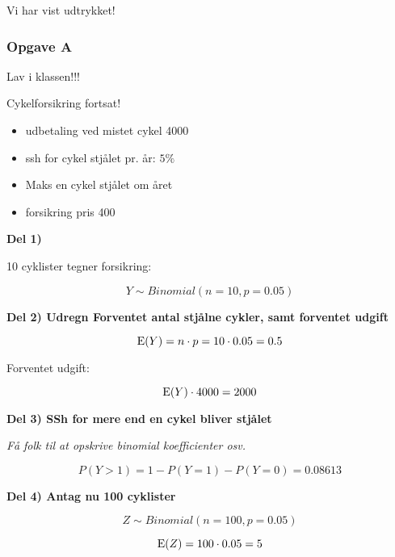 Vi har vist udtrykket!

\subsubsection{Opgave A}

Lav i klassen!!!

Cykelforsikring fortsat!

\begin{itemize}
    \item udbetaling ved mistet cykel 4000
    \item ssh for cykel stjålet pr. år: $5 \%$
    \item Maks en cykel stjålet om året
    \item forsikring pris 400
\end{itemize}

\textbf{Del 1)}

10 cyklister tegner forsikring:

\begin{equation}
    Y \sim Binomial(n = 10, p=0.05)
\end{equation}

\textbf{Del 2) Udregn Forventet antal stjålne cykler, samt forventet udgift}

\begin{equation}
    \text{E}(Y) = n \cdot p = 10 \cdot 0.05 = 0.5
\end{equation}

Forventet udgift:

\begin{equation}
    \text{E}(Y) \cdot 4000 = 2000
\end{equation}

\textbf{Del 3) SSh for mere end en cykel bliver stjålet}

\textit{Få folk til at opskrive binomial koefficienter osv.}

\begin{equation}
    P(Y>1) = 1 - P(Y =  1) - P(Y = 0) = 0.08613
\end{equation}

\textbf{Del 4) Antag nu  100 cyklister}

\begin{equation}
    Z \sim Binomial(n = 100, p=0.05)
\end{equation}

\begin{equation}
    \text{E}(Z) = 100 \cdot 0.05 = 5
\end{equation}

